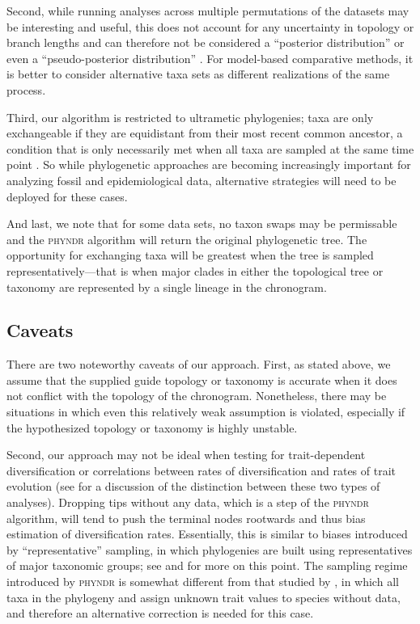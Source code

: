 \documentclass[a4paper,11pt]{article}
\begin{document}
Second, while running analyses across multiple permutations of the datasets may be interesting and useful, this does not account for any uncertainty in topology or branch lengths and can therefore not be considered a ``posterior distribution'' or even a ``pseudo-posterior distribution'' \citep[\emph{sensu}][]{ThomasPastis, Rabosky2015}. For model-based comparative methods, it is better to consider alternative taxa sets as different realizations of the same process. 

Third, our algorithm is restricted to ultrametic phylogenies; taxa are only exchangeable if they are equidistant from their most recent common ancestor, a condition that is only necessarily met when all taxa are sampled at the same time point \citep[see][for more discussion of this point and its implications for models of trait evolution]{SlaterMEE}. So while phylogenetic approaches are becoming increasingly important for analyzing fossil and epidemiological data, alternative strategies will need to be deployed for these cases.

And last, we note that for some data sets, no taxon swaps may be permissable and the \textsc{phyndr} algorithm will return the original phylogenetic tree. The opportunity for exchanging taxa will be greatest when the tree is sampled representatively---that is when major clades in either the topological tree or taxonomy are represented by a single lineage in the chronogram.

\subsection{Caveats}

There are two noteworthy caveats of our approach. First, as stated above, we assume that the supplied guide topology or taxonomy is accurate when it does not conflict with the topology of the chronogram. Nonetheless, there may be situations in which even this relatively weak assumption is violated, especially if the hypothesized topology or taxonomy is highly unstable. 

Second, our approach may not be ideal when testing for trait-dependent diversification \citep[e.g.,][]{Maddison2007, FitzJohn2012} or correlations between rates of diversification and rates of trait evolution \citep[e.g.,][]{Rabosky2013, Rabosky2014} (see \citealt{PennellPE} for a discussion of the distinction between these two types of analyses). Dropping tips without any data, which is a step of the \textsc{phyndr} algorithm, will tend to push the terminal nodes rootwards and thus bias estimation of diversification rates. Essentially, this is similar to biases introduced by ``representative'' sampling, in which phylogenies are built using representatives of major taxonomic groups; see \citet{Hohna2011} and \citet{Stadler2013} for more on this point. The sampling regime introduced by \textsc{phyndr} is somewhat different from that studied by \citet{FitzJohn2009}, in which all taxa in the phylogeny and assign unknown trait values to species without data, and therefore an alternative correction is needed for this case.  
\end{document}
